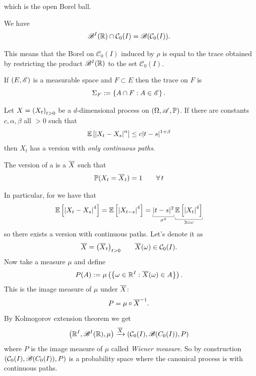 \documentclass[12pt]{report}
\begin{document}
which is the open Borel ball.
\begin{lemma}
	We have
	\begin{equation*}
		\mathscr{B}^{I}(\mathbb{R})\cap \mathcal{C}_{0}(I)=\mathscr{B}(\mathcal{C}_{0}(I)).
	\end{equation*}
\end{lemma}
This means that the Borel \sa{} on $\mathcal{C}_{0}(I)$ induced by $\rho$ is equal to the trace \sa{} obtained by restricting the product \sa{} $\mathscr{B}^{I}(\mathbb{R})$ to the set $\mathcal{C}_{0}(I)$.
\begin{definition}
	If $(E,\mathscr{E})$ is a measurable space and $F\subset E$ then the trace \sa{} on $F$ is
	\begin{equation*}
		\Sigma_{F}:=\left\{A\cap F:A\in\mathscr{E}\right\}.
	\end{equation*}
\end{definition}
\begin{theorem}
	Let $X={\left({X}_{t}\right)}_{t>0}$ be a $d$-dimensional process on $(\Omega,\mathscr{A},\mathbb{P})$. If there are constants $c,\alpha,\beta$ all $>0$ such that
	\begin{equation*}
		\mathbb{E}\left[\left|X_{t}-X_{s}\right|^{\alpha}\right]\leq c|t-s|^{1+\beta}
	\end{equation*}
	then $X_{t}$ has a version with \emph{only continuous paths}.
\end{theorem}
\begin{revise}
	The version of a \rv{} is a \rv{} $\overline{X}$ such that
	\begin{equation*}
		\mathbb{P}(X_{t}=\overline{X}_{t})=1\qquad\forall\, t
	\end{equation*}
\end{revise}
In particular, for \bwm{} we have that
\begin{equation*}
	\ev{\left|X_{t}-X_{s}\right|^{4}}=\ev{\left|X_{t-s}\right|^{4}}=\ubracketthin{|t-s|^{2}}_{\sigma^{4}}\ubracketthin{\ev{\left|X_{t}\right|^{4}}}_{3=c}
\end{equation*}
so there exists a version with continuous paths. Let's denote it as
\begin{equation*}
	\overline{X}={\left({\overline{X}}_{t}\right)}_{t>0}\qquad\overline{X}(\omega)\in\mathcal{C}_{0}(I).
\end{equation*}
Now take a measure $\mu$ and define
\begin{equation*}
	P(A):=\mu\left(\left\{\omega\in\mathbb{R}^{I}:\overline{X}(\omega)\in A\right\}\right).
\end{equation*}
This is the image measure of $\mu$ under $\overline{X}$:
\begin{equation*}
	P=\mu\circ\overline{X}^{-1}.
\end{equation*}
By Kolmogorov extension theorem we get
\begin{equation*}
	\left(\mathbb{R}^{I},\mathscr{B}^{I}(\mathbb{R}),\mu\right)\xrightarrow{\overline{X}}\left(\mathcal{C}_{0}(I),\mathscr{B}(C_{0}(I)),P\right)
\end{equation*}
where $P$ is the image measure of $\mu$ called \emph{Wiener measure}. So by construction $\left(\mathcal{C}_{0}(I),\mathscr{B}(C_{0}(I)),P\right)$ is a probability space where the canonical process is \bwm{} with continuous paths.
\end{document}
